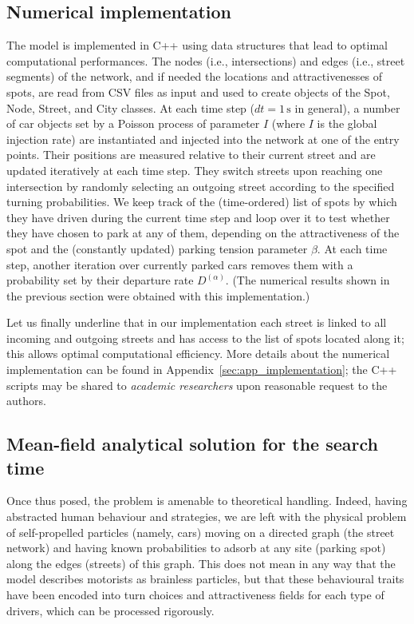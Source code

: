 \documentclass[trsc,reprint]{informs3}
\newcommand{\alp}{^{(\alpha)}}
\begin{document}
\subsection{Numerical implementation \label{sec:implementation}}
The model is implemented in C++ using data structures that lead to optimal computational performances.
The nodes (i.e., intersections) and edges (i.e., street segments) of the network, and if needed the locations and attractivenesses of spots, are read from CSV files as input and used to create objects of the
Spot, Node, Street, and City classes. 
At each time step ($dt=1\,\mathrm{s}$ in general), a number of car objects set by a Poisson process of 
parameter $I$ (where $I$ is the global injection rate)
are instantiated and injected into the network at one of the entry points. Their positions are measured 
relative to their current street and are updated iteratively at each time step. They switch
streets upon reaching one intersection by randomly selecting an outgoing street according to the specified turning probabilities. We keep track of the (time-ordered) list of spots by which they have driven during the current time step and loop over it to test whether they have chosen to park at any of them, depending
on the attractiveness of the spot and the (constantly updated) parking tension parameter $\beta$. At each time step, another
iteration over currently parked cars removes them with a probability set by their departure rate $D\alp$. 
(The numerical results shown in the previous section were obtained with this implementation.)

Let us finally underline that in our implementation each street is linked to all incoming and outgoing streets and has access to the list of spots located along it; this
allows optimal computational efficiency. More details about the numerical implementation
can be found in Appendix~\ref{sec:app_implementation}; the C++ scripts may be shared to \emph{academic researchers} upon reasonable request to the authors.


\subsection{Mean-field analytical solution for the search time}
\label{sub:ana_method}
Once thus posed, the problem is amenable to theoretical handling. Indeed, having abstracted human behaviour and strategies, we are left with the physical problem of self-propelled particles (namely, cars) moving on 
a directed graph (the street network) and having known probabilities to adsorb at any site (parking spot) along the edges (streets) of this graph. This does not mean in any way that the model describes motorists as brainless particles, but
that these behavioural traits have been encoded into turn choices and attractiveness fields for each type of drivers, which can be processed rigorously.
\end{document}
